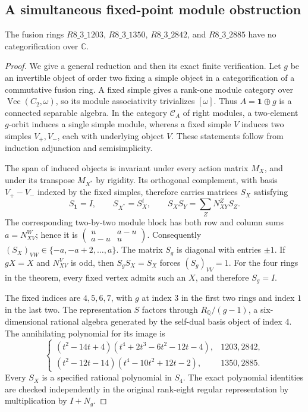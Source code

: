 \subsection{A simultaneous fixed-point module obstruction}
\label{subsec:simultaneous-fixed-point}

\begin{theorem}
The fusion rings $R8\_3\_1203$, $R8\_3\_1350$, $R8\_3\_2842$, and
$R8\_3\_2885$ have no categorification over $\mathbb C$.
\end{theorem}
\begin{proof}
We give a general reduction and then its exact finite verification.
Let $g$ be an invertible object of order two fixing a simple object in a
categorification of a commutative fusion ring.  A fixed simple gives a
rank-one module category over $\operatorname{Vec}(C_2,\omega)$, so its
module associativity trivializes $[\omega]$.  Thus $A=\mathbf1\oplus g$
is a connected separable algebra.  In the category $\mathcal C_A$ of
right modules, a two-element $g$-orbit induces a single simple module,
whereas a fixed simple $V$ induces two simples $V_+,V_-$, each with
underlying object $V$.  These statements follow from induction
adjunction and semisimplicity.

The span of induced objects is invariant under every action matrix
$M_X$, and under its transpose $M_{X^*}$ by rigidity.  Its orthogonal
complement, with basis $V_+-V_-$ indexed by the fixed simples, therefore
carries matrices $S_X$ satisfying
\[
 S_{\mathbf1}=I,\qquad S_{X^*}=S_X^t,\qquad
 S_XS_Y=\sum_Z N_{XY}^Z S_Z.
\]
The corresponding two-by-two module block has both row and column sums
$a=N_{XV}^W$; hence it is
$\left(\begin{smallmatrix}u&a-u\\a-u&u\end{smallmatrix}\right)$.
Consequently $(S_X)_{VW}\in\{-a,-a+2,\ldots,a\}$.
The matrix $S_g$ is diagonal with entries $\pm1$.
If $gX=X$ and $N_{XV}^V$ is odd, then
$S_gS_X=S_X$ forces $(S_g)_{VV}=1$.  For the four rings in the theorem,
every fixed vertex admits such an $X$, and therefore $S_g=I$.

The fixed indices are $4,5,6,7$, with $g$ at index $3$ in the first two
rings and index $1$ in the last two.  The representation $S$ factors
through $R_{\mathbb Q}/(g-1)$, a six-dimensional rational algebra
generated by the self-dual basis object of index $4$.  The annihilating
polynomial for its image is
\[
\begin{cases}
(t^2-14t+4)(t^4+2t^3-6t^2-12t-4),&1203,2842,\\
(t^2-12t-14)(t^4-10t^2+12t-2),&1350,2885.
\end{cases}
\]
Every $S_X$ is a specified rational polynomial in $S_4$.  The exact
polynomial identities are checked independently in the original
rank-eight regular representation by multiplication by $I+N_g$.


\end{proof}

